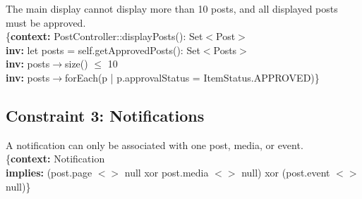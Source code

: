 \documentclass{article}
\begin{document}
The main display cannot display more than 10 posts, and all displayed posts must be approved. \\

\{\textbf{context:} PostController::displayPosts(): Set$<$Post$>$ \\
\textbf{inv:} let posts = self.getApprovedPosts(): Set$<$Posts$>$ \\
\textbf{inv:} posts$\rightarrow$size() $\leq$ 10 \\
\textbf{inv:} posts$\rightarrow$forEach(p | p.approvalStatus = ItemStatus.APPROVED)\} \\

\subsection{Constraint 3: Notifications}

A notification can only be associated with one post, media, or event. \\

\{\textbf{context:} Notification \\
\textbf{implies:} (post.page $<$$>$ null xor post.media $<$$>$ null) xor (post.event $<$$>$ null)\}  \\
\end{document}
